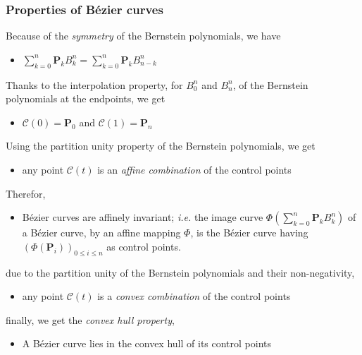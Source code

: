 \subsubsection*{Properties of B\'ezier curves}
Because of the \textit{symmetry} of the Bernstein polynomials, we have
\begin{itemize}
  \item  $\sum_{k=0}^n \mathbf{P}_k B_k^n = \sum_{k=0}^n \mathbf{P}_k B_{n-k}^n $
\end{itemize}
Thanks to the interpolation property, for $B_0^n$ and $B_n^n$, of the Bernstein polynomials at the endpoints, we get
\begin{itemize}
  \item $\mathcal{C}(0) = \mathbf{P}_0$  and $\mathcal{C}(1) = \mathbf{P}_n$ 
\end{itemize}
Using the partition unity property of the Bernstein polynomials, we get
\begin{itemize}
  \item any point $\mathcal{C}(t)$ is an \textit{affine combination} of the control points 
\end{itemize}
Therefor,
\begin{itemize}
  \item B\'ezier curves are affinely invariant; \textit{i.e.} the image curve $\Phi(\sum_{k=0}^n \mathbf{P}_k B_k^n)$ of a B\'ezier curve, by an affine mapping $\Phi$, is the B\'ezier curve having $\left( \Phi(\mathbf{P}_i) \right)_{0 \le i \le n}$ as control points. 
\end{itemize}
due to the partition unity of the Bernstein polynomials and their non-negativity, 
\begin{itemize}
  \item any point $\mathcal{C}(t)$ is a \textit{convex combination} of the control points 
\end{itemize}
finally, we get the \textit{convex hull property},
\begin{itemize}
  \item A B\'ezier curve lies in the convex hull of its control points 
\end{itemize}

